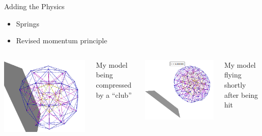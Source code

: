 \documentclass{beamer}
\begin{document}
\begin{frame}{Adding the Physics}

\begin{itemize}
\item Springs
\item Revised momentum principle
\end{itemize}

\begin{columns}
\includegraphics[width = 1.0\textwidth]{compression}
\begin{center}\scriptsize My model being compressed by a ``club'' \end{center}

\includegraphics[width = 1.0\textwidth]{flying}
\begin{center}\scriptsize My model flying shortly after being hit \end{center}

\end{columns}
\end{frame}
\end{document}

